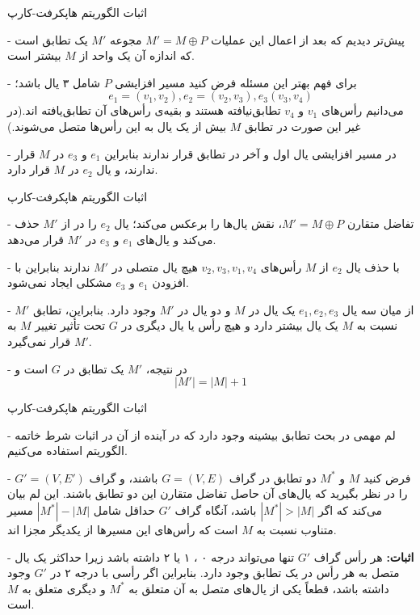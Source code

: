 \begin{itemframe}{اثبات الگوریتم هاپکرفت-کارپ}
\item[-]
پیش‌تر دیدیم که بعد از اعمال این عملیات
$M' = M \oplus P$
مجوعه $M' $ یک تطابق است که اندازه آن یک واحد از $M$ بیشتر است.
\item[-]
برای فهم بهتر این مسئله  فرض کنید مسیر افزایشی $P$ شامل ۳ یال باشد؛
$$ e_1=(v_1, v_2), e_2=(v_2, v_3), e_3(v_3, v_4)$$
می‌دانیم رأس‌های
$v_1$ و
$v_4$
تطابق‌نیافته هستند و بقیه‌ی رأس‌های آن تطابق‌یافته ‌اند.(در غیر این ‌صورت در تطابق $M$ بیش از یک یال به این رأس‌ها
متصل می‌شوند.)

\item[-]
در مسیر افزایشی یال اول و آخر در تطابق قرار ندارند بنابراین
$e_1$ و
$e_3$
در $M$ قرار ندارند، و یال
$e_2$
در $M$ قرار دارد.
\end{itemframe}


\begin{itemframe}{اثبات الگوریتم هاپکرفت-کارپ}
\item[-]
تفاضل متقارن $M' = M \oplus P$، نقش یال‌ها را برعکس می‌کند؛ یال
$e_2$
را در از $M'$ حذف می‌کند و یال‌های
$e_1$ و
$e_3$
در $M'$ قرار می‌دهد.
\item[-]
با حذف یال
$e_2$
از $M$ رأس‌های
$v_2, v_3, v_1, v_4$
هیچ یال متصلی در $M'$  ندارند بنابراین با افزودن
$e_1$ و
$e_3$
مشکلی ایجاد نمی‌شود.
\item[-]
از میان سه یال
$e_1, e_2, e_3$
یک یال در $M$ و دو یال در $M'$ وجود دارد. بنابراین، تطابق $M'$ نسبت به $M$ یک یال بیشتر دارد و هیچ رأس یا یال دیگری در $G$ تحت تأثیر تغییر $M$ به $M'$ قرار نمی‌گیرد.
\item[-]
در نتیجه، $M'$ یک تطابق در $G$ است و
$$|M'| = |M| + 1$$

\end{itemframe}


\begin{itemframe}{اثبات الگوریتم هاپکرفت-کارپ}
\item[-]
لم مهمی در بحث تطابق بیشینه وجود دارد که در آینده از آن در اثبات شرط خاتمه الگوریتم استفاده می‌کنیم.
\item[-]
فرض کنید
$M$ و
$M^*$
دو تطابق در گراف
$G = (V, E)$
 باشند، و گراف
$G' = (V, E')$
را در نظر بگیرید که یال‌های آن حاصل تفاضل متقارن این دو تطابق باشند. این لم بیان می‌کند که  اگر
$|M^*| > |M|$
باشد، آنگاه گراف $G'$ حداقل شامل $|M^*| - |M|$ مسیر متناوب نسبت به $M$ است که رأس‌های این مسیرها از یکدیگر مجزا اند.
\item[-]
\textbf{اثبات:}
هر رأس گراف $G'$ تنها می‌تواند درجه ۰ ، ۱ یا ۲ داشته باشد زیرا حداکثر یک یال متصل به هر رأس در یک تطابق وجود دارد. بنابراین اگر رأسی با درجه ۲ در  $G'$ وجود داشته باشد، قطعاً یکی از یال‌های متصل به آن متعلق به $M^*$ و دیگری متعلق به $M$ است.

\end{itemframe}


